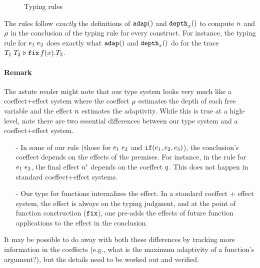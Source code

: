 \documentclass[a4paper,11pt]{article}
\theoremstyle{definition}
\begin{document}
\begin{figure}

  \caption{Typing rules}
  \label{fig:type-rules}
\end{figure}

The rules follow \emph{exactly} the definitions of $\mathtt{adap}()$ and
$\mathtt{depth}_{x}()$ to compute $n$ and $\rho$ in the conclusion of the
typing rule for every construct. For instance, the typing rule for
$e_1 \; e_2$ does exactly what $\mathtt{adap}()$ and $\mathtt{depth}_{x}()$
do for the trace $T_1 \; T_2 \mathrel{\triangleright} {\mathop{\mathtt{fix}} f(x).T_3}$.

\paragraph{Remark}
The astute reader might note that our type system looks very much like
a coeffect+effect system where the coeffect $\rho$ estimates the
depth of each free variable and the effect $n$ estimates the
adaptivity. While this is true at a high-level, note there are two
essential differences between our type system and a coeffect+effect
system.
\begin{itemize}
\item[-] In some of our rule (those for $e_1 \; e_2$ and
  $\mathtt{if}(e_1, e_2, e_3)$), the conclusion's coeffect
  depends on the effects of the premises. For instance, in the rule
  for $e_1 \; e_2$, the final effect $n'$ depends on
  the coeffect $q$. This does not happen in standard
  coeffect+effect systems.
\item[-] Our type for functions internalizes the effect. In a standard
  coeffect + effect system, the effect is always on the typing
  judgment, and at the point of function construction ($\mathop{\mathtt{fix}}$), one
  pre-adds the effects of future function applications to the effect
  in the conclusion. 
\end{itemize}
It may be possible to do away with both these differences by tracking
more information in the coeffects (e.g., what is the maximum
adaptivity of a function's argument?), but the details need to be
worked out and verified.
\end{document}
